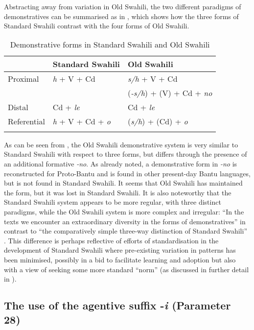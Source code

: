 \documentclass[output=paper]{langscibook}
\begin{document}
Abstracting away from variation in Old Swahili, the two different paradigms of demonstratives can be summarised as in , which shows how the three forms of Standard Swahili contrast with the four forms of Old Swahili. 



\begin{table}
\begin{tabular}{lll} 
\lsptoprule
& {Standard Swahili} & {Old Swahili}\\
\midrule
{Proximal} & \textit{h} + V + Cd & \textit{s/h} + V + Cd\\
           &                     & (\textit{{}-s/h}) + (V) + Cd + \textit{no}\\
{Distal} & Cd + \textit{le} & Cd + \textit{le~}\\
{Referential} & \textit{h} + V + Cd + \textit{o} & (\textit{s/h}) + (Cd) + \textit{o}~\\
\lspbottomrule
\end{tabular}
\caption{Demonstrative forms in Standard Swahili and Old Swahili}
\label{tab:marten:3}
\end{table}

As can be seen from , the Old Swahili demonstrative system is very similar to Standard Swahili with respect to three forms, but differs through the presence of an additional formative \textit{{}-no}. As already noted, a demonstrative form in \textit{{}-no} is reconstructed for Proto-Bantu and is found in other present-day Bantu languages, but is not found in Standard Swahili. It seems that Old Swahili has maintained the form, but it was lost in Standard Swahili. It is also noteworthy that the Standard Swahili system appears to be more regular, with three distinct paradigms, while the Old Swahili system is more complex and irregular: ``In the texts we encounter an extraordinary diversity in the forms of demonstratives'' in contrast to ``the comparatively simple three-way distinction of Standard Swahili'' \citep[137]{Miehe1979}. This difference is perhaps reflective of efforts of standardisation in the development of Standard Swahili where pre-existing variation in patterns has been minimised, possibly in a bid to facilitate learning and adoption but also with a view of seeking some more standard ``norm'' (as discussed in further detail in ).

\subsection{The use of the agentive suffix -\textit{i} (Parameter 28)}\label{sec:marten:3.3}
\end{document}
